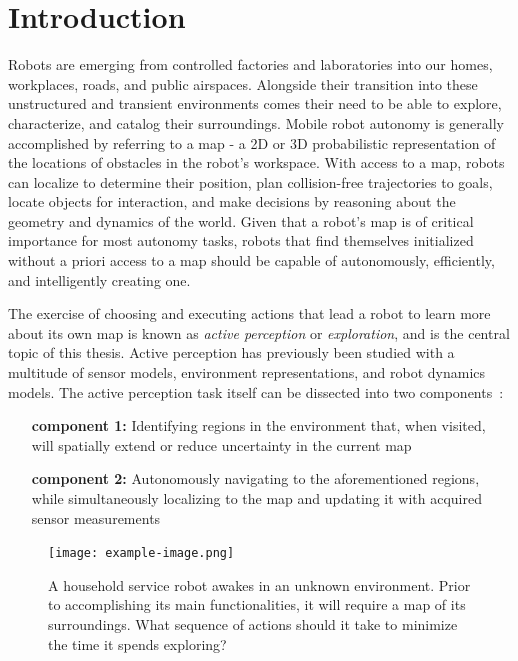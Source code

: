 \chapter{Introduction}
\label{chapter1}

Robots are emerging from controlled factories and
laboratories into our homes, workplaces, roads, and public airspaces.
Alongside their transition into these unstructured and transient environments
comes their need to be able to explore, characterize, and catalog their surroundings.
Mobile robot autonomy is generally accomplished by referring to a map - a 2D or 3D
probabilistic representation of the locations of obstacles in the robot's workspace.
With access to a map, robots can localize to determine their position, plan collision-free
trajectories to goals, locate objects for interaction, and make decisions by
reasoning about the geometry and dynamics of the world. Given that a robot's map
is of critical importance for most autonomy tasks, robots that find
themselves initialized without a priori access to a map should be capable of
autonomously, efficiently, and intelligently creating one.

The exercise of choosing and executing actions that lead a robot to learn more about its own
map is known as \textit{active perception} or \textit{exploration}, and
is the central topic of this thesis. Active perception has previously been studied with a
multitude of sensor models, environment representations, and robot dynamics
models. The active perception task itself can be dissected into two
components~\cite{shen20113d}:

\begin{enumerate}[leftmargin=3.2cm]
  \item[\bf component 1:] Identifying regions in the environment that, when visited, will
    spatially extend or reduce uncertainty in the current map
  \item[\bf component 2:] Autonomously navigating to the aforementioned regions, while
    simultaneously localizing to the map and updating it with acquired sensor
    measurements
\end{enumerate}

\begin{figure}[ht]
  \centering
  \texttt{[image: example-image.png]}
  \caption{A household service robot awakes in an unknown environment. Prior to
  accomplishing its main functionalities, it will require a map of its surroundings.
What sequence of actions should it take to minimize the time it spends
exploring? \label{fig:motivation}}
\end{figure}

